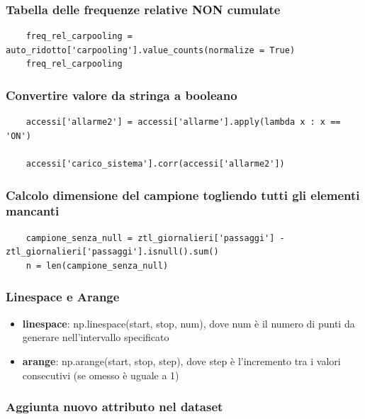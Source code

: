 \documentclass{article}
\begin{document}
\subsubsection*{Tabella delle frequenze relative NON cumulate}

\begin{lstlisting}
    freq_rel_carpooling = auto_ridotto['carpooling'].value_counts(normalize = True)
    freq_rel_carpooling
\end{lstlisting}

\subsubsection*{Convertire valore da stringa a booleano}

\begin{lstlisting}
    accessi['allarme2'] = accessi['allarme'].apply(lambda x : x == 'ON')

    accessi['carico_sistema'].corr(accessi['allarme2'])
\end{lstlisting}

\subsubsection*{Calcolo dimensione del campione togliendo tutti gli elementi mancanti}

\begin{lstlisting}
    campione_senza_null = ztl_giornalieri['passaggi'] - ztl_giornalieri['passaggi'].isnull().sum()
    n = len(campione_senza_null)
\end{lstlisting}

\subsubsection*{Linespace e Arange}

\begin{itemize}
    \item \textbf{linespace}: np.linespace(start, stop, num), dove num è il numero di punti da generare nell'intervallo specificato
    \item \textbf{arange}: np.arange(start, stop, step), dove step è l'incremento tra i valori consecutivi (se omesso è uguale a 1)
\end{itemize}

\subsubsection*{Aggiunta nuovo attributo nel dataset}
\end{document}
